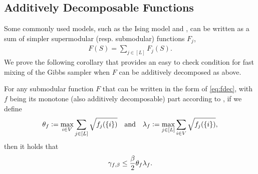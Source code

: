 \subsection{Additively Decomposable Functions}
Some commonly used models, such as the Ising model and \flid{}, can be written as a sum of simpler supermodular (resp. submodular) functions $F_{j}$,
\begin{align} \label{eq:fdec}
F(S) = \sum_{j \in [L]} F_{j}(S).
\end{align}
We prove the following corollary that provides an easy to check condition for fast mixing of the Gibbs sampler when $F$ can be additively decomposed as above.
\begin{cor} \label{cor:fast}
  For any submodular function $F$ that can be written in the form of \eqref{eq:fdec}, with $f$ being its monotone (also additively decomposable) part according to , if we define
  \begin{align*}
  	\theta_f \vcentcolon= \max_{i \in V} \sum_{j\in [L]} \sqrt{f_{j}(\{i\})} \hspace{1em}\textrm{and}\hspace{1em} \lambda_f \vcentcolon= \max_{j\in [L]} \sum_{i \in V} \sqrt{f_{j}(\{i\})},
  \end{align*}
  then it holds that
  \begin{align*}
  	\gamma_{f,\beta} \leq \frac{\beta}{2} \theta_f \lambda_f.
  \end{align*}
\end{cor}

